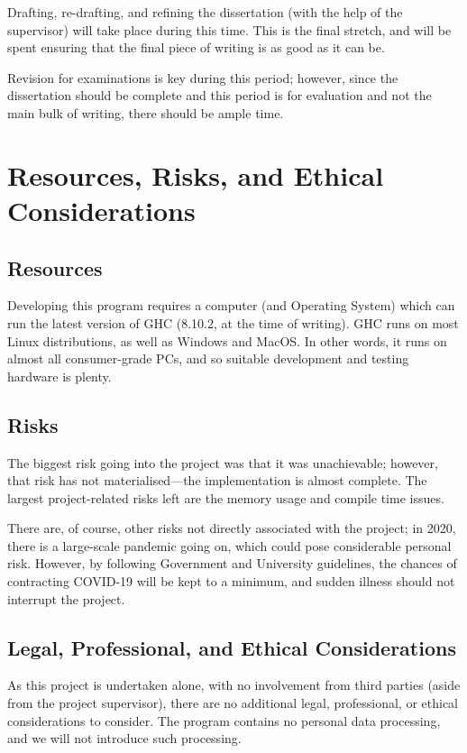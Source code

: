 \documentclass[12pt, a4paper]{scrartcl}
\begin{document}
Drafting, re-drafting, and refining the dissertation (with the help of the supervisor) will take place during this time. This is the final stretch, and will be spent ensuring that the final piece of writing is as good as it can be.

Revision for examinations is key during this period; however, since the dissertation should be complete and this period is for evaluation and not the main bulk of writing, there should be ample time.

\section{Resources, Risks, and Ethical Considerations}

\subsection{Resources}

Developing this program requires a computer (and Operating System) which can run the latest version of GHC (8.10.2, at the time of writing). GHC runs on most Linux distributions, as well as Windows and MacOS. In other words, it runs on almost all consumer-grade PCs, and so suitable development and testing hardware is plenty.

\subsection{Risks}

The biggest risk going into the project was that it was unachievable; however, that risk has not materialised---the implementation is almost complete. The largest project-related risks left are the memory usage and compile time issues. 

There are, of course, other risks not directly associated with the project; in 2020, there is a large-scale pandemic going on, which could pose considerable personal risk. However, by following Government and University guidelines, the chances of contracting COVID-19 will be kept to a minimum, and sudden illness should not interrupt the project.

\subsection{Legal, Professional, and Ethical Considerations}

As this project is undertaken alone, with no involvement from third parties (aside from the project supervisor), there are no additional legal, professional, or ethical considerations to consider. The program contains no personal data processing, and we will not introduce such processing.




\end{document}
